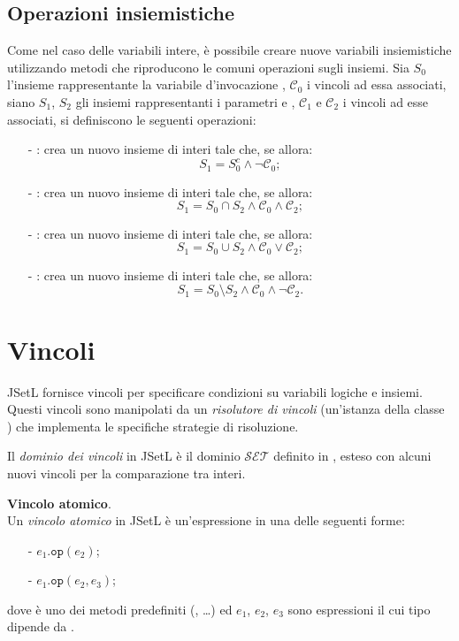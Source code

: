 \subsection{Operazioni insiemistiche}
Come nel caso delle variabili intere, è possibile creare nuove
variabili insiemistiche utilizzando metodi che riproducono le comuni operazioni
sugli insiemi. Sia $S_0$ l'insieme rappresentante la variabile d'invocazione
,
$\mathcal{C}_0$ i vincoli ad essa associati, siano $S_1$, $S_2$ gli insiemi
rappresentanti i parametri  e , $\mathcal{C}_1$ e
$\mathcal{C}_2$  i vincoli ad esse associati, si definiscono le seguenti 
operazioni:
\begin{itemize}
\item[-]: 
crea un nuovo insieme di interi tale che, se 
allora:
\[
S_1 = S_0^c \wedge \neg  \mathcal{C}_0;
\]
\item[-]: crea un nuovo insieme di interi
tale che, se  allora:
\[
S_1 = S_0 \cap S_2 \wedge \mathcal{C}_0 \wedge \mathcal{C}_2;
\]
\item[-]: crea un nuovo insieme di interi
tale che, se  allora:
\[
S_1 = S_0 \cup S_2 \wedge \mathcal{C}_0 \vee \mathcal{C}_2;
\]
\item[-]: crea un nuovo insieme di interi
tale che, se  allora:
\[
S_1 = S_0 \setminus S_2 \wedge \mathcal{C}_0 \wedge \neg \mathcal{C}_2.
\]
\end{itemize}


\section{Vincoli}
JSetL fornisce vincoli per specificare condizioni su variabili logiche e 
insiemi. Questi vincoli sono manipolati da un \emph{risolutore di vincoli} 
(un'istanza della classe ) che implementa le specifiche
strategie di risoluzione.

Il \emph{dominio dei vincoli} in JSetL è il dominio $\mathcal{SET}$ definito
in \cite{artClp}, esteso con alcuni nuovi vincoli per la comparazione tra 
interi.
\begin{flushleft}\textbf{Vincolo atomico}.\\
Un \emph{vincolo atomico} in JSetL è un'espressione in una delle 
seguenti forme:
\begin{itemize}
\item[-] $e_1.\texttt{op}(e_2)$;
\item[-] $e_1.\texttt{op}(e_2, e_3)$;
\end{itemize}
dove   è uno dei metodi predefiniti (,
\ldots) ed $e_1$, $e_2$, $e_3$ sono espressioni il cui tipo dipende da 
.
\end{flushleft}

